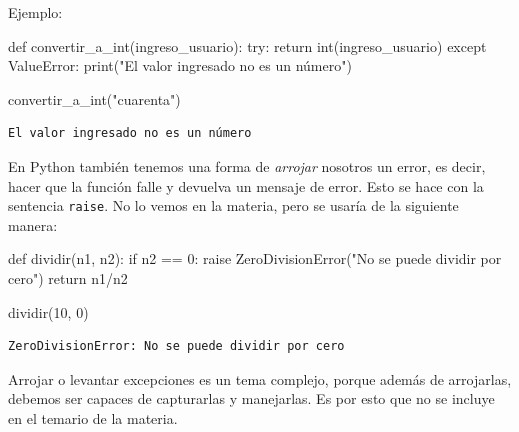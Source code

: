 \documentclass[
  letterpaper,
  DIV=11,
  numbers=noendperiod]{scrreprt}
\newenvironment{Shaded}{\begin{snugshade}}{\end{snugshade}}
\newcommand{\BuiltInTok}[1]{\textcolor[rgb]{0.00,0.23,0.31}{#1}}
\newcommand{\ControlFlowTok}[1]{\textcolor[rgb]{0.00,0.23,0.31}{#1}}
\newcommand{\DecValTok}[1]{\textcolor[rgb]{0.68,0.00,0.00}{#1}}
\newcommand{\KeywordTok}[1]{\textcolor[rgb]{0.00,0.23,0.31}{#1}}
\newcommand{\NormalTok}[1]{\textcolor[rgb]{0.00,0.23,0.31}{#1}}
\newcommand{\OperatorTok}[1]{\textcolor[rgb]{0.37,0.37,0.37}{#1}}
\newcommand{\PreprocessorTok}[1]{\textcolor[rgb]{0.68,0.00,0.00}{#1}}
\newcommand{\StringTok}[1]{\textcolor[rgb]{0.13,0.47,0.30}{#1}}
\begin{document}
Ejemplo:

\begin{Shaded}
\begin{Highlighting}[]
\KeywordTok{def}\NormalTok{ convertir\_a\_int(ingreso\_usuario):}
  \ControlFlowTok{try}\NormalTok{:}
    \ControlFlowTok{return} \BuiltInTok{int}\NormalTok{(ingreso\_usuario)}
  \ControlFlowTok{except} \PreprocessorTok{ValueError}\NormalTok{:}
    \BuiltInTok{print}\NormalTok{(}\StringTok{"El valor ingresado no es un número"}\NormalTok{)}

\NormalTok{convertir\_a\_int(}\StringTok{"cuarenta"}\NormalTok{)}
\end{Highlighting}
\end{Shaded}

\begin{verbatim}
El valor ingresado no es un número
\end{verbatim}

\begin{tcolorbox}[enhanced jigsaw, bottomrule=.15mm, leftrule=.75mm, opacityback=0, colback=white, toprule=.15mm, bottomtitle=1mm, opacitybacktitle=0.6, rightrule=.15mm, left=2mm, arc=.35mm, coltitle=black, title=\textcolor{quarto-callout-note-color}{\faInfo}\hspace{0.5em}{Note}, breakable, toptitle=1mm, colframe=quarto-callout-note-color-frame, titlerule=0mm, colbacktitle=quarto-callout-note-color!10!white]

En Python también tenemos una forma de \emph{arrojar} nosotros un error,
es decir, hacer que la función falle y devuelva un mensaje de error.
Esto se hace con la sentencia \texttt{raise}. No lo vemos en la materia,
pero se usaría de la siguiente manera:

\begin{Shaded}
\begin{Highlighting}[]
\KeywordTok{def}\NormalTok{ dividir(n1, n2):}
  \ControlFlowTok{if}\NormalTok{ n2 }\OperatorTok{==} \DecValTok{0}\NormalTok{:}
    \ControlFlowTok{raise} \PreprocessorTok{ZeroDivisionError}\NormalTok{(}\StringTok{"No se puede dividir por cero"}\NormalTok{)}
  \ControlFlowTok{return}\NormalTok{ n1}\OperatorTok{/}\NormalTok{n2}

\NormalTok{dividir(}\DecValTok{10}\NormalTok{, }\DecValTok{0}\NormalTok{)}
\end{Highlighting}
\end{Shaded}

\begin{verbatim}
ZeroDivisionError: No se puede dividir por cero
\end{verbatim}

Arrojar o levantar excepciones es un tema complejo, porque además de
arrojarlas, debemos ser capaces de capturarlas y manejarlas. Es por esto
que no se incluye en el temario de la materia.

\end{tcolorbox}
\end{document}
